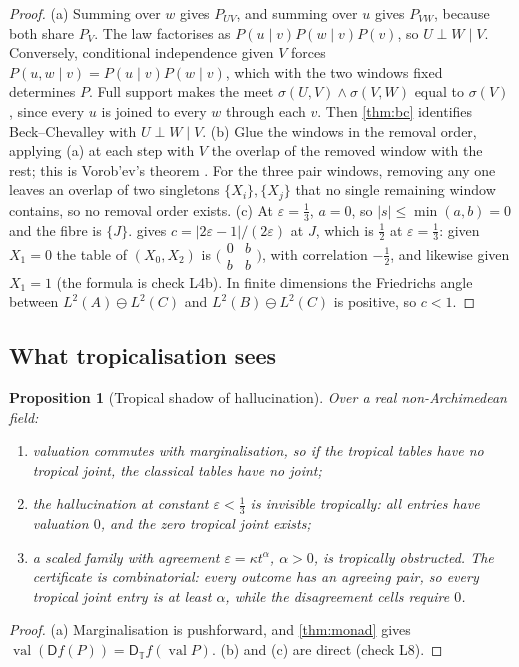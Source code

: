 \documentclass[11pt]{article}
\newtheorem{proposition}[theorem]{Proposition}
\theoremstyle{definition}
\newcommand{\D}{\mathsf D}
\newcommand{\T}{\mathbb T}
\newcommand{\val}{\operatorname{val}}
\begin{document}
\begin{proof}
(a) Summing over $w$ gives $P_{UV}$, and summing over $u$ gives $P_{VW}$, because both share $P_V$. The law factorises as
$P(u\mid v)P(w\mid v)P(v)$, so $U\perp W\mid V$. Conversely, conditional independence given $V$ forces
$P(u,w\mid v)=P(u\mid v)P(w\mid v)$, which with the two windows fixed determines $P$. Full support makes the meet
$\sigma(U,V)\wedge\sigma(V,W)$ equal to $\sigma(V)$, since every $u$ is joined to every $w$ through each $v$. Then \cref{thm:bc} identifies
Beck--Chevalley with $U\perp W\mid V$.
(b) Glue the windows in the removal order, applying (a) at each step with $V$ the overlap of the removed window with the rest; this is
Vorob'ev's theorem \cite{Vorobev1962}. For the three pair windows, removing any one leaves an overlap of two singletons
$\{X_i\},\{X_j\}$ that no single remaining window contains, so no removal order exists.
(c) At $\varepsilon=\tfrac13$, $a=0$, so $|s|\le\min(a,b)=0$ and the fibre is $\{J\}$.  gives
$c=|2\varepsilon-1|/(2\varepsilon)$ at $J$, which is $\tfrac12$ at $\varepsilon=\tfrac13$: given $X_1=0$ the table of $(X_0,X_2)$ is $\bigl(\begin{smallmatrix}0&b\\b&b\end{smallmatrix}\bigr)$, with correlation $-\tfrac12$, and likewise given $X_1=1$ (the formula is check L4b). In finite dimensions the Friedrichs
angle between $L^2(A)\ominus L^2(C)$ and $L^2(B)\ominus L^2(C)$ is positive, so $c<1$.
\end{proof}

\subsection{What tropicalisation sees}\label{sec:halluc-trop}
\begin{proposition}[Tropical shadow of hallucination]\label{prop:halluc-trop}
Over a real non-Archimedean field:
\begin{enumerate}[label=(\alph*)]
\item valuation commutes with marginalisation, so if the tropical tables have no tropical joint, the classical tables have no joint;
\item the hallucination at constant $\varepsilon<\tfrac13$ is invisible tropically: all entries have valuation $0$, and the zero tropical
  joint exists;
\item a scaled family with agreement $\varepsilon=\kappa t^{\alpha}$, $\alpha>0$, is tropically obstructed. The certificate is
  combinatorial: every outcome has an agreeing pair, so every tropical joint entry is at least $\alpha$, while the disagreement cells
  require $0$.
\end{enumerate}
\end{proposition}
\begin{proof}
(a) Marginalisation is pushforward, and \cref{thm:monad} gives $\val(\D f(P))=\D_{\T}f(\val P)$. (b) and (c) are direct (check L8).
\end{proof}
\end{document}
